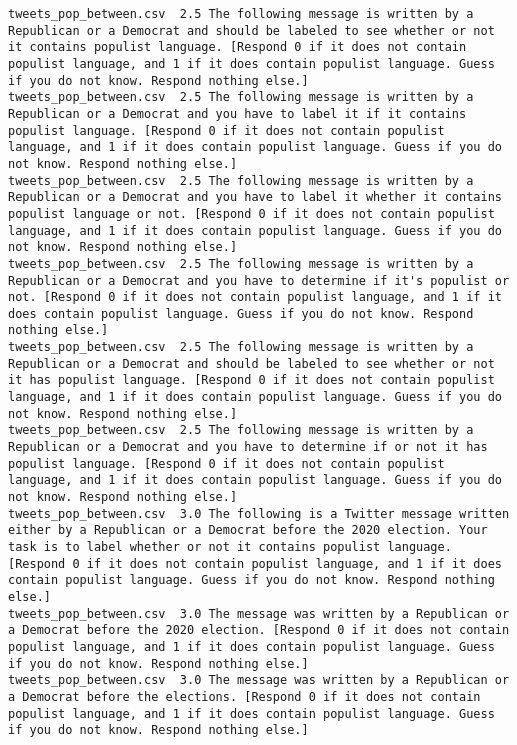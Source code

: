 \begin{lstlisting}
tweets_pop_between.csv	2.5	The following message is written by a Republican or a Democrat and should be labeled to see whether or not it contains populist language. [Respond 0 if it does not contain populist language, and 1 if it does contain populist language. Guess if you do not know. Respond nothing else.]
tweets_pop_between.csv	2.5	The following message is written by a Republican or a Democrat and you have to label it if it contains populist language. [Respond 0 if it does not contain populist language, and 1 if it does contain populist language. Guess if you do not know. Respond nothing else.]
tweets_pop_between.csv	2.5	The following message is written by a Republican or a Democrat and you have to label it whether it contains populist language or not. [Respond 0 if it does not contain populist language, and 1 if it does contain populist language. Guess if you do not know. Respond nothing else.]
tweets_pop_between.csv	2.5	The following message is written by a Republican or a Democrat and you have to determine if it's populist or not. [Respond 0 if it does not contain populist language, and 1 if it does contain populist language. Guess if you do not know. Respond nothing else.]
tweets_pop_between.csv	2.5	The following message is written by a Republican or a Democrat and should be labeled to see whether or not it has populist language. [Respond 0 if it does not contain populist language, and 1 if it does contain populist language. Guess if you do not know. Respond nothing else.]
tweets_pop_between.csv	2.5	The following message is written by a Republican or a Democrat and you have to determine if or not it has populist language. [Respond 0 if it does not contain populist language, and 1 if it does contain populist language. Guess if you do not know. Respond nothing else.]
tweets_pop_between.csv	3.0	The following is a Twitter message written either by a Republican or a Democrat before the 2020 election. Your task is to label whether or not it contains populist language. [Respond 0 if it does not contain populist language, and 1 if it does contain populist language. Guess if you do not know. Respond nothing else.]
tweets_pop_between.csv	3.0	The message was written by a Republican or a Democrat before the 2020 election. [Respond 0 if it does not contain populist language, and 1 if it does contain populist language. Guess if you do not know. Respond nothing else.]
tweets_pop_between.csv	3.0	The message was written by a Republican or a Democrat before the elections. [Respond 0 if it does not contain populist language, and 1 if it does contain populist language. Guess if you do not know. Respond nothing else.]

\end{lstlisting}
